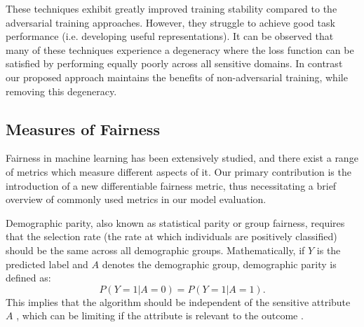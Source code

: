 These techniques exhibit greatly improved training stability compared to the adversarial training approaches. However, they struggle to achieve good task performance (i.e. developing useful representations). It can be observed that many of these techniques experience a degeneracy where the loss function can be satisfied by performing equally poorly across all sensitive domains. In contrast our proposed approach maintains the benefits of non-adversarial training, while removing this degeneracy.

\subsection{Measures of Fairness}
Fairness in machine learning has been extensively studied, and there exist a range of metrics which measure different aspects of it. Our primary contribution is the introduction of a new differentiable fairness metric, thus necessitating a brief overview of commonly used metrics in our model evaluation. %

Demographic parity, also known as statistical parity or group fairness, requires that the selection rate (the rate at which individuals are positively classified) should be the same across all demographic groups. Mathematically, if \( Y \) is the predicted label and \( A \) denotes the demographic group, demographic parity is defined as:
%
\vspace{-0.1cm}\begin{equation}
P(Y=1|A=0) = P(Y=1|A=1).
\end{equation}
%
This implies that the algorithm should be independent of the sensitive attribute \( A \) \cite{dwork2012}, which can be limiting if the attribute is relevant to the outcome \cite{hardt2016equality}.%


